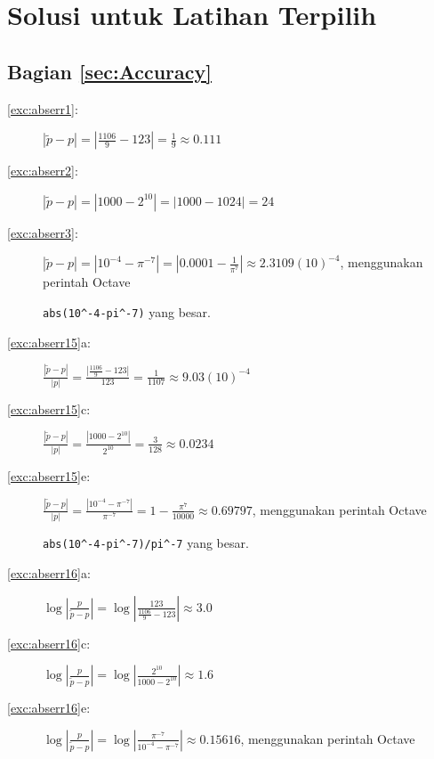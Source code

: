 
\chapter*{Solusi untuk Latihan Terpilih}

\section*{Bagian \ref{sec:Accuracy}}

\fancyhead[LO]{}
\begin{description}
\item [{\ref{exc:abserr1}:}] $|\tilde{p}-p|=\left|\frac{1106}{9}-123\right|=\frac{1}{9}\approx0.111$
\item [{\ref{exc:abserr2}:}] $|\tilde{p}-p|=|1000-2^{10}|=|1000-1024|=24$
\item [{\ref{exc:abserr3}:}] $|\tilde{p}-p|=|10^{-4}-\pi^{-7}|=\left|0.0001-\frac{1}{\pi^{7}}\right|\approx2.3109(10)^{-4}$,
menggunakan perintah Octave

\begin{center}
\texttt{abs(10\textasciicircum -4-pi\textasciicircum -7)} yang besar.
\par\end{center}
\item [{\ref{exc:abserr15}a:}] ${\displaystyle \frac{|\tilde{p}-p|}{|p|}=\frac{\left|\frac{1106}{9}-123\right|}{123}=\frac{1}{1107}\approx9.03(10)^{-4}}$
\item [{\ref{exc:abserr15}c:}] ${\displaystyle \frac{|\tilde{p}-p|}{|p|}=\frac{|1000-2^{10}|}{2^{10}}=\frac{3}{128}\approx0.0234}$
\item [{\ref{exc:abserr15}e:}] ${\displaystyle \frac{|\tilde{p}-p|}{|p|}=\frac{|10^{-4}-\pi^{-7}|}{\pi^{-7}}=1-\frac{\pi^{7}}{10000}}\approx0.69797$,
menggunakan perintah Octave

\begin{center}
\texttt{abs(10\textasciicircum -4-pi\textasciicircum -7)/pi\textasciicircum -7}
yang besar.
\par\end{center}
\item [{\ref{exc:abserr16}a:}] ${\displaystyle \log\left|\frac{p}{\tilde{p}-p}\right|=\log\left|\frac{123}{\frac{1106}{9}-123}\right|\approx3.0}$
\item [{\ref{exc:abserr16}c:}] ${\displaystyle \log\left|\frac{p}{\tilde{p}-p}\right|=\log\left|\frac{2^{10}}{1000-2^{10}}\right|\approx1.6}$
\item [{\ref{exc:abserr16}e:}] ${\displaystyle \log\left|\frac{p}{\tilde{p}-p}\right|=\log\left|\frac{\pi^{-7}}{10^{-4}-\pi^{-7}}\right|\approx0.15616}$,
menggunakan perintah Octave


\end{description}
